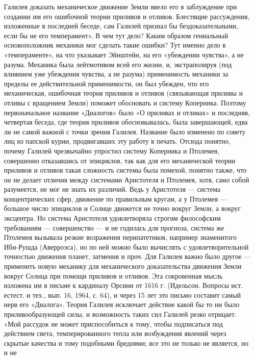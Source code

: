Галилея доказать механическое движение Земли ввело его в заблуждение при
создании им его ошибочной теории приливов и отливов. Блестящие рассуждения,
изложенные в последней беседе, сам Галилей признал бы бездоказательными, если
бы не его темперамент». В чем тут дело? Каким образом гениальный основоположник
механики мог сделать такие ошибки? Тут именно дело в «темпераменте», на что
указывает Эйнштейн, на его «убеждении чувства», а не разума. Механика была
лейтмотивом всей его жизни, и, экстраполируя (под влиянием уже убеждения
чувства, а не разума) применимость механики за пределы ее действительной
применимости, он был убежден, что его механическая, ошибочная теория приливов и
отливов (связывающая приливы и отливы с вращением Земли) поможет обосновать и
систему Коперника. Поэтому первоначальное название «Диалогов» было «О приливах
и отливах» и последняя, четвертая беседа, где теория приливов обосновывалась,
была завершающей, едва ли не самой важной с точки зрения Галилея. Название было
изменено по совету лиц из папской курии, продвигавших эту работу в печать.
Отсюда понятно, почему Галилей чрезвычайно упростил систему Коперника и
Птолемея, совершенно отказавшись от эпициклов, так как для его механической
теории приливов и отливов такая сложность системы была помехой, понятно также,
что он не делает отличия между системами Аристотеля и Птолемея, хотя, само
собой разумеется, не мог не знать их различий. Ведь у Аристотеля --- система
концентрических сфер, движение по правильным кругам, а у Птолемея --- большое
число эпициклов и Солнце движется не точно вокруг Земли, а вокруг эксцентра. Но
система Аристотеля удовлетворяла строгим философским требованиям --- совершенство
--- и не годилась для прогноза, система же Птолемея вызывала резкие возражения
перипатетиков, например знаменитого Ибн-Рушда (Аверроэса), но по ней можно было
вычислять с удовлетворительной точностью движения планет, затмения и проч. Для
Галилея важно было другое --- применить новую механику для механического
доказательства движения Земли вокруг Солнца при помощи приливов и отливов. Эта
сокровенная мысль изложена им в письме к кардиналу Орсини от 1616 г. (Идельсон.
Вопросы ист. естест. и тех., вып. 16, 1964, с. 64), и через 15 лет это письмо
составит самый нерв его «Диалога». Теория Галилея исключает действие какой бы
то ни было приливообразующей силы, и возможность таких сил Галилей резко
отрицает. «Мой рассудок не может приспособиться к тому, чтобы подписаться под
действием света, темперированного тепла или возбуждения явлений через скрытые
качества и тому подобными бреднями; все это не только не является, но и не
